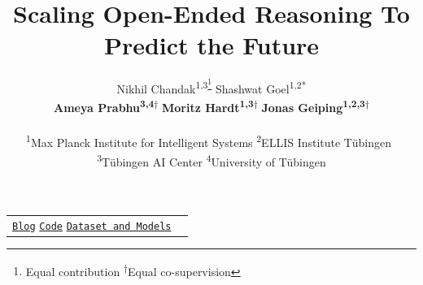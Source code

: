 \documentclass{article} %
\title{\vspace{-0.5cm}Scaling Open-Ended Reasoning To Predict the Future}
\author{
Nikhil Chandak\textsuperscript{1,3\thanks{Equal contribution \quad \textsuperscript{\ensuremath{\dagger}}Equal co-supervision}}\quad
Shashwat Goel\textsuperscript{1,2*}\\
\textbf{Ameya Prabhu\textsuperscript{3,4\ensuremath{\dagger}}}\quad
\textbf{Moritz Hardt\textsuperscript{1,3\ensuremath{\dagger}}}\quad
\textbf{Jonas Geiping\textsuperscript{1,2,3\ensuremath{\dagger}}}
\\\\
\textsuperscript{1}Max Planck Institute for Intelligent Systems \quad
\textsuperscript{2}ELLIS Institute T\"ubingen\ \\
\textsuperscript{3}T\"ubingen AI Center\quad
\textsuperscript{4}University of T\"ubingen
}
\begin{document}
\maketitle


\vspace{-0.5cm}
\begin{center}
    \begin{tabular}{c@{\hskip 19pt}c}
    \hspace*{1.4cm}\raisebox{-1pt}{\faGlobe} \href{https://openforecaster.github.io/}{\texttt{Blog}}
    \hspace*{1.4cm}\raisebox{-1pt}{\faGithub} \href{https://github.com/OpenForecaster/scaling-forecasting-training}{\fontsize{8.8pt}{0pt}\texttt{Code}}
    \hspace*{1.6cm}\raisebox{-1.5pt}{\faDatabase}\href{https://huggingface.co/collections/nikhilchandak/openforecaster}{\fontsize{8.8pt}{0pt} \texttt{Dataset and Models}} 
\end{tabular}
\end{center}

\lhead{} %
\renewcommand{\headrulewidth}{0pt} %
\vspace{0.25cm}
\begin{abstract}
    
\end{abstract}
\vspace{-0.2cm}












\end{document}
